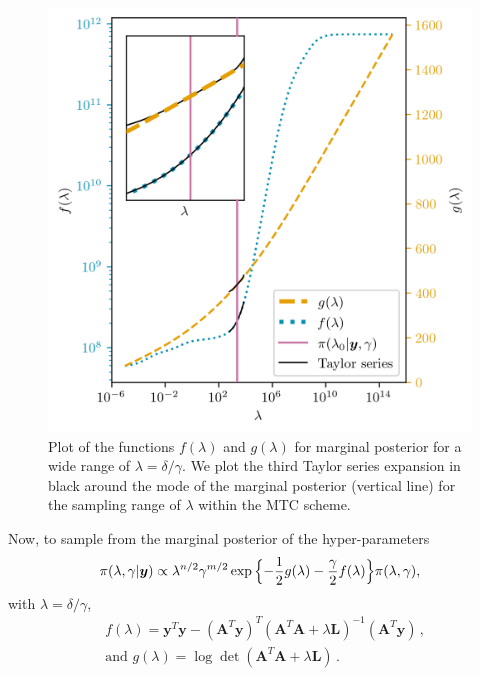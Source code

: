 \begin{figure}[ht!]
	\centering
	\includegraphics{f_and_g_phd.png}
	\caption[Plot of the functions $f(\lambda)$ and $g(\lambda)$ for marginal posterior.]{Plot of the functions $f(\lambda)$ and $g(\lambda)$ for marginal posterior for a wide range of $\lambda = \delta / \gamma$. We plot the third Taylor series expansion in black around the mode of the marginal posterior (vertical line) for the sampling range of $\lambda$ within the MTC scheme.}
	\label{fig:fandg}
\end{figure}
Now, to sample from the marginal posterior of the hyper-parameters
\begin{align}
	\pi(\lambda, \gamma | \bm{y})
	\propto  \lambda^{n/2} \gamma^{m/2}   \exp{ \Bigl\{ - \frac{1}{2} g ( \lambda) - \frac{\gamma}{2} f ( \lambda) \Bigr\} } \pi(\lambda, \gamma),
	\label{eq:MargPostAppl}
\end{align}
with $\lambda = \delta / \gamma$,
\begin{subequations}
	\label{eq:fandg}
	\begin{align}
		&f ( \lambda) = \bm{y}^T \bm{y} - (\bm{A}^T \bm{y})^T (\bm{A}^T  \bm{A} + \lambda \bm{L})^{-1} (\bm{A}^T \bm{y})  \, ,  \\
		&\text{and } g(\lambda) = \log \det (\bm{A}^T  \bm{A} + \lambda \bm{L}) \,.
	\end{align}
\end{subequations}
